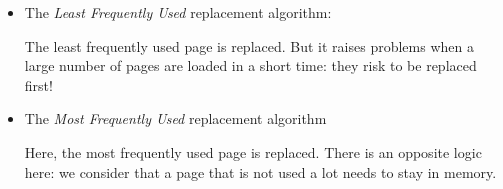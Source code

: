\documentclass{beamer}[10pt, usepdftitle=false, handout]
\begin{document}
	\begin{frame}
	
	\begin{itemize}
	\item{The \textit{Least Frequently Used} replacement algorithm:
	\vspace*{1em}
	
	The least frequently used page is replaced. But it raises problems when a large number of pages are loaded in a short time: they risk to be replaced first!	
	\vspace*{1em}
	}
	\item{The \textit{Most Frequently Used} replacement algorithm
	\vspace*{1em}	
	
	Here, the most frequently used page is replaced. There is an opposite logic here: we consider that a page that is not used a lot needs to stay in memory.
	\vspace*{1em}	
	}
	\end{itemize}		
	
	\end{frame}
	
		
	
	
\end{document}
